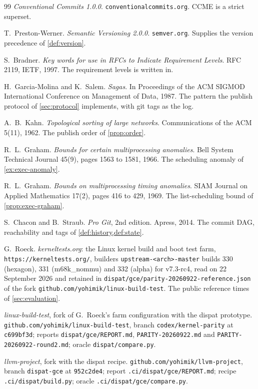 \begin{thebibliography}{99}
\emph{Conventional Commits 1.0.0}. \texttt{conventionalcommits.org}. CCME is a
strict superset.

T.~Preston-Werner. \emph{Semantic Versioning 2.0.0}. \texttt{semver.org}.
Supplies the version precedence of \cref{def:version}.

S.~Bradner. \emph{Key words for use in RFCs to Indicate Requirement Levels}.
RFC 2119, IETF, 1997. The requirement levels \SPEC{} is written in.

H.~Garcia-Molina and K.~Salem. \emph{Sagas}. In Proceedings of the ACM SIGMOD
International Conference on Management of Data, 1987. The pattern the publish
protocol of \cref{sec:protocol} implements, with git tags as the log.

A.~B.~Kahn. \emph{Topological sorting of large networks}. Communications of the
ACM 5(11), 1962. The publish order of \cref{prop:order}.

R.~L.~Graham. \emph{Bounds for certain multiprocessing anomalies}. Bell System
Technical Journal 45(9), pages 1563 to 1581, 1966. The scheduling anomaly of
\cref{ex:exec-anomaly}.

R.~L.~Graham. \emph{Bounds on multiprocessing timing anomalies}. SIAM Journal
on Applied Mathematics 17(2), pages 416 to 429, 1969. The list-scheduling bound
of \cref{prop:exec-graham}.

S.~Chacon and B.~Straub. \emph{Pro Git}, 2nd edition. Apress, 2014. The commit
DAG, reachability and tags of \cref{def:history,def:state}.

G.~Roeck. \emph{kerneltests.org}: the Linux kernel build and boot test farm,
\texttt{https://kerneltests.org/}, builders \texttt{upstream-<arch>-master}
builds 330 (hexagon), 331 (m68k\_nommu) and 332 (alpha) for v7.3-rc4, read on
22 September 2026 and retained in
\texttt{dispat/gce/parity-20260922-reference.json} of the fork
\texttt{github.com/yohimik/linux-build-test}. The public reference times of
\cref{sec:evaluation}.

\emph{linux-build-test}, fork of G.~Roeck's farm configuration with the dispat
prototype. \texttt{github.com/yohimik/linux-build-test}, branch
\texttt{codex/kernel-parity} at \texttt{c699bf3d}; reports
\texttt{dispat/gce/REPORT.md}, \texttt{PARITY-20260922.md} and
\texttt{PARITY-20260922-round2.md}; oracle \texttt{dispat/compare.py}.

\emph{llvm-project}, fork with the dispat recipe. \texttt{github.com/yohimik/llvm-project},
branch \texttt{dispat-gce} at \texttt{952c2de4}; report
\texttt{.ci/dispat/gce/REPORT.md}; recipe \texttt{.ci/dispat/build.py}; oracle
\texttt{.ci/dispat/gce/compare.py}.


\end{thebibliography}

